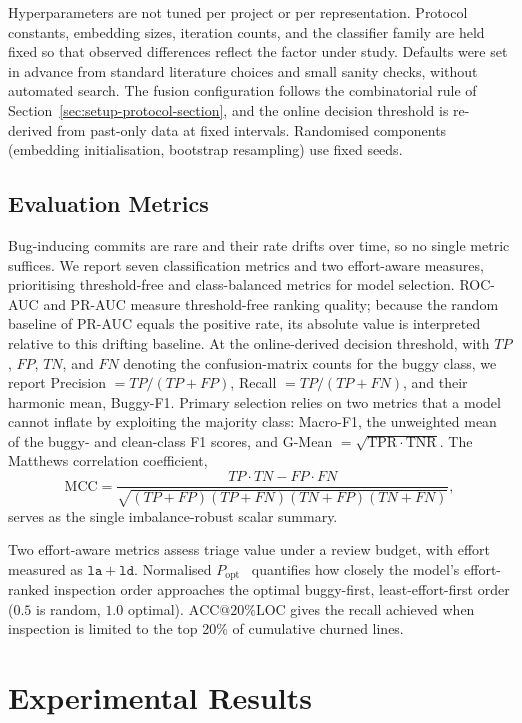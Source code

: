 \documentclass[final,5p,times,twocolumn]{elsarticle}
\theoremstyle{plain}
\begin{document}
Hyperparameters are not tuned per project or per representation. Protocol constants, embedding sizes, iteration counts, and the classifier family are held fixed so that observed differences reflect the factor under study. Defaults were set in advance from standard literature choices and small sanity checks, without automated search. The fusion configuration follows the combinatorial rule of Section~\ref{sec:setup-protocol-section}, and the online decision threshold is re-derived from past-only data at fixed intervals. Randomised components (embedding initialisation, bootstrap resampling) use fixed seeds.
\subsection{Evaluation Metrics}
\label{sec:setup-metrics-section}

Bug-inducing commits are rare and their rate drifts over time, so no single metric suffices. We report seven classification metrics and two effort-aware measures, prioritising threshold-free and class-balanced metrics for model selection. ROC-AUC and PR-AUC measure threshold-free ranking quality; because the random baseline of PR-AUC equals the positive rate, its absolute value is interpreted relative to this drifting baseline. At the online-derived decision threshold, with $TP$, $FP$, $TN$, and $FN$ denoting the confusion-matrix counts for the buggy class, we report Precision $= TP/(TP+FP)$, Recall $= TP/(TP+FN)$, and their harmonic mean, Buggy-F1. Primary selection relies on two metrics that a model cannot inflate by exploiting the majority class: Macro-F1, the unweighted mean of the buggy- and clean-class F1 scores, and G-Mean $= \sqrt{\mathrm{TPR}\cdot\mathrm{TNR}}$. The Matthews correlation coefficient,
\begin{equation}
\mathrm{MCC} = \frac{TP\cdot TN - FP\cdot FN}{\sqrt{(TP+FP)(TP+FN)(TN+FP)(TN+FN)}},
\end{equation}
serves as the single imbalance-robust scalar summary.

Two effort-aware metrics assess triage value under a review budget, with effort measured as $\mathtt{la}+\mathtt{ld}$. Normalised $P_{\mathrm{opt}}$~\cite{kamei2013large} quantifies how closely the model's effort-ranked inspection order approaches the optimal buggy-first, least-effort-first order ($0.5$ is random, $1.0$ optimal). $\mathrm{ACC@20\%LOC}$ gives the recall achieved when inspection is limited to the top 20\% of cumulative churned lines.

\section{Experimental Results}
\label{sec:results}
\end{document}
